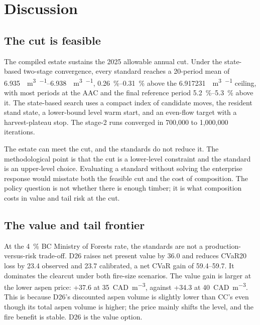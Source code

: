 \section{Discussion}
\label{sec:discussion}

\subsection{The cut is feasible}

The compiled estate sustains the 2025 allowable annual cut. Under the state-based two-stage
convergence, every standard reaches a 20-period mean of
\SIrange{6.935}{6.938}{\mega\cubic\meter\per\year}, \SIrange{0.26}{0.31}{\percent} above the
\SI{6.917231}{\mega\cubic\meter\per\year} ceiling, with most periods at the AAC and the final
reference period \SIrange{5.2}{5.3}{\percent} above it. The state-based search uses a compact index of
candidate moves, the resident stand state, a lower-bound level warm start, and an even-flow target
with a harvest-plateau stop. The stage-2 runs converged in 700,000 to 1,000,000 iterations.

The estate can meet the cut, and the standards do not reduce it. The methodological point is that
the cut is a lower-level constraint and the standard is an upper-level choice. Evaluating a standard
without solving the enterprise response would misstate both the feasible cut and the cost of
composition. The policy question is not whether there is enough timber; it is what composition costs
in value and tail risk at the cut.

\subsection{The value and tail frontier}

At the \SI{4}{\percent} BC Ministry of Forests rate, the standards are not a production-versus-risk
trade-off. D26 raises net present value by \SI{36.0}{\millionCAD} and reduces CVaR20 loss by
\SI{23.4}{\millionCAD} observed and \SI{23.7}{\millionCAD} calibrated, a net CVaR gain of
\SIrange{59.4}{59.7}{\millionCAD}. It dominates the clearcut under both fire-size scenarios. The value
gain is larger at the lower aspen price: +\SI{37.6}{\millionCAD} at \SI{35}{CAD\per\cubic\meter},
against +\SI{34.3}{\millionCAD} at \SI{40}{CAD\per\cubic\meter}. This is because D26's discounted
aspen volume is slightly lower than CC's even though its total aspen volume is higher; the price
mainly shifts the level, and the fire benefit is stable. D26 is the value option.

